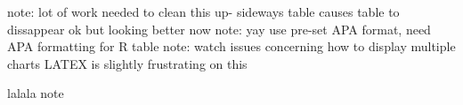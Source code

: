 \documentclass[]{article}
\begin{document}
\centering



note: lot of work needed to clean this up- sideways table causes table to dissappear ok but looking better now
note: yay use pre-set APA format, need APA formatting for R table
note: watch issues concerning how to display multiple charts LATEX is slightly frustrating on this

lalala note

\end{document}
